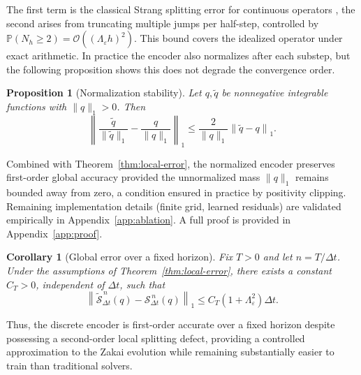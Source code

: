 \documentclass{article}
\newcommand{\lengComments}[1]{\par\smallskip\noindent\textcolor{lengCommentColor}{\textbf{[Leng comment:} #1\textbf{]}}\par\smallskip}
\newtheorem{proposition}[theorem]{Proposition}
\newtheorem{corollary}[theorem]{Corollary}
\begin{document}

The first term is the classical Strang splitting error for continuous operators \citep{bensoussan1990approximation, strang1968construction}, the second arises from truncating multiple jumps per half-step, controlled by $\mathbb{P}(N_h \ge 2)=\mathcal{O}((\Lambda_{\varepsilon}h)^2)$. This bound covers the idealized operator under exact arithmetic. In practice the encoder also normalizes after each substep, but the following proposition shows this does not degrade the convergence order.
\begin{proposition}[Normalization stability]
\label{prop:norm-stability}
Let $q, \tilde{q}$ be nonnegative integrable functions with $\|q\|_1 > 0$. Then
\[
\left\lVert \frac{\tilde{q}}{\|\tilde{q}\|_1} - \frac{q}{\|q\|_1} \right\rVert_1
\le
\frac{2}{\|q\|_1}\left\lVert \tilde{q} - q \right\rVert_1.
\]
\end{proposition}

Combined with Theorem~\ref{thm:local-error}, the normalized encoder preserves first-order global accuracy provided the unnormalized mass $\|q\|_1$ remains bounded away from zero, a condition ensured in practice by positivity clipping. Remaining implementation details (finite grid, learned residuals) are validated empirically in Appendix~\ref{app:ablation}. A full proof is provided in Appendix~\ref{app:proof}.

\begin{corollary}[Global error over a fixed horizon]
\label{cor:global-error}
Fix $T>0$ and let $n=T/\Delta t$. Under the assumptions of Theorem~\ref{thm:local-error}, there exists a constant $C_T>0$, independent of $\Delta t$, such that
\begin{equation*}
\left\lVert
\widetilde{\mathcal{S}}_{\Delta t}^{\,n}(q)
-
\mathcal{S}_{\Delta t}^{\,n}(q)
\right\rVert_1
\le
C_T(1+\Lambda_{\varepsilon}^2)\Delta t.
\end{equation*}
\end{corollary}

Thus, the discrete encoder is first-order accurate over a fixed horizon despite possessing a second-order local splitting defect, providing a controlled approximation to the Zakai evolution while remaining substantially easier to train than traditional solvers.
\end{document}
